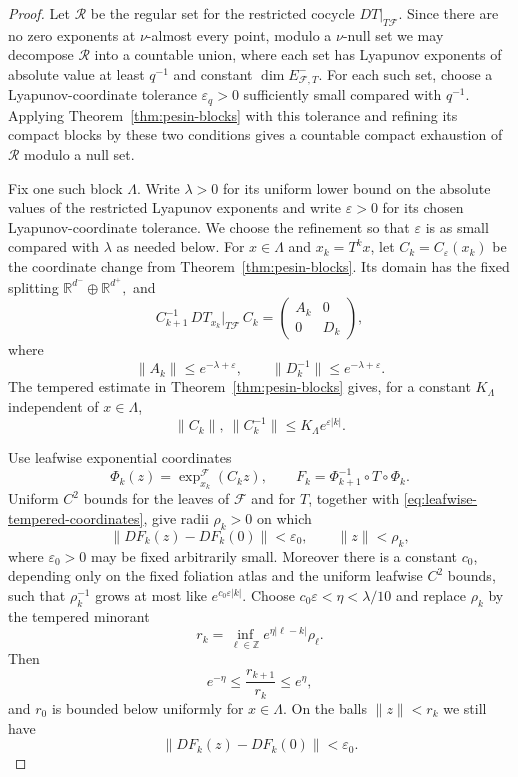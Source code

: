 \documentclass[11pt]{amsart}
\numberwithin{equation}{section}
\theoremstyle{plain}
\begin{document}
\begin{proof}
Let $\mathcal R$ be the regular set for the restricted cocycle
$DT|_{T\mathcal F}$.  Since there are no zero exponents at $\nu$-almost
every point, modulo a $\nu$-null set we may decompose $\mathcal R$ into a countable union, where each set has Lyapunov exponents of absolute value at least $q^{-1}$
and constant $\dim E^-_{\mathcal F,T}$.  For each such set,
choose a Lyapunov-coordinate tolerance $\varepsilon_q>0$ sufficiently small
compared with $q^{-1}$.  Applying Theorem~\ref{thm:pesin-blocks} with this
tolerance and refining its compact blocks by these two conditions gives a
countable compact exhaustion of $\mathcal R$ modulo a null set.

Fix one such block $\Lambda$.  Write $\lambda>0$ for its uniform lower bound
on the absolute values of the restricted Lyapunov exponents and write
$\varepsilon>0$ for its chosen Lyapunov-coordinate tolerance.  We choose the
refinement so that $\varepsilon$ is as small compared with $\lambda$ as
needed below.  For $x\in\Lambda$
and $x_k=T^kx$, let
$
 C_k=C_\varepsilon(x_k)
$
be the coordinate change from Theorem~\ref{thm:pesin-blocks}.  Its domain
has the fixed splitting
$
 \mathbb R^{d^-}\oplus\mathbb R^{d^+},
$
and
\[
 C_{k+1}^{-1}\,DT_{x_k}|_{T\mathcal F}\,C_k
 =
 \begin{pmatrix}
 A_k&0\\
 0&D_k
 \end{pmatrix},
\]
where
\begin{equation}\label{eq:leafwise-linear-hyperbolicity}
 \|A_k\|\le e^{-\lambda+\varepsilon},
 \qquad
 \|D_k^{-1}\|\le e^{-\lambda+\varepsilon}.
\end{equation}
The tempered estimate in Theorem~\ref{thm:pesin-blocks} gives, for a
constant $K_\Lambda$ independent of $x\in\Lambda$,
\begin{equation}\label{eq:leafwise-tempered-coordinates}
 \|C_k\|,\ \|C_k^{-1}\|
 \le K_\Lambda e^{\varepsilon|k|}.
\end{equation}

Use leafwise exponential coordinates
\[
 \Phi_k(z)=\exp^{\mathcal F}_{x_k}(C_kz),
 \qquad
 F_k=\Phi_{k+1}^{-1}\circ T\circ\Phi_k.
\]
Uniform $C^2$ bounds for the leaves of $\mathcal F$ and for $T$, together
with \eqref{eq:leafwise-tempered-coordinates}, give radii $\rho_k>0$ on
which
\[
 \|DF_k(z)-DF_k(0)\|<\varepsilon_0,
 \qquad \|z\|<\rho_k,
\]
where $\varepsilon_0>0$ may be fixed arbitrarily small.  Moreover there is
a constant $c_0$, depending only on the fixed foliation atlas and the
uniform leafwise $C^2$ bounds, such that $\rho_k^{-1}$ grows at most like
$e^{c_0\varepsilon|k|}$.  Choose
$c_0\varepsilon<\eta<\lambda/10
$
and replace $\rho_k$ by the tempered minorant
\[
 r_k=\inf_{\ell\in\mathbb Z}e^{\eta|\ell-k|}\rho_\ell.
\]
Then
\begin{equation}\label{eq:leafwise-tempered-radii}
 e^{-\eta}\le \frac{r_{k+1}}{r_k}\le e^\eta,
\end{equation}
and $r_0$ is bounded below uniformly for $x\in\Lambda$.  On the balls
$\|z\|<r_k$ we still have
\begin{equation}\label{eq:leafwise-nonlinear-smallness}
 \|DF_k(z)-DF_k(0)\|<\varepsilon_0.
\end{equation}


\end{proof}
\end{document}

